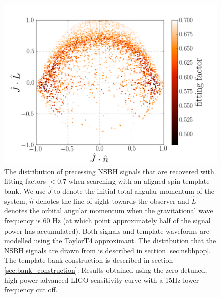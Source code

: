 \begin{figure}
\begin{center}
\includegraphics[width=1.0\textwidth]
{papers/nsbh_effectualness/figure12.pdf}
\end{center}
\caption{\label{fig:arseofsauron}
The distribution of precessing NSBH signals that are recovered with fitting
factors $< 0.7$ when searching with an aligned-spin template bank. We use
$\hat{J}$ to denote the initial total angular momentum of the system, $\hat{n}$
denotes the line of sight towards the observer
and $\hat{L}$ denotes the orbital angular momentum when the gravitational wave frequency is 60 Hz 
(at which point approximately half of the signal power has accumulated). 
Both signals and template waveforms are modelled using the TaylorT4 approximant.
The distribution that the NSBH signals are drawn from
is described in section \ref{sec:nsbhpop}. The template bank construction
is described in section \ref{sec:bank_construction}. Results obtained
using the zero-detuned, high-power advanced LIGO sensitivity curve with a 15Hz
lower frequency cut off.
}
\end{figure}

